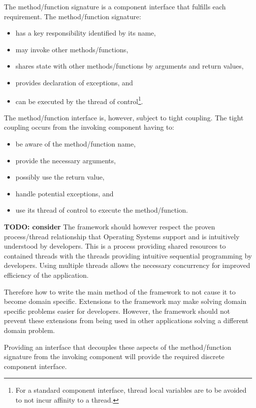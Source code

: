 \documentclass[prodmode]{style/acmlarge}
\begin{document}
The method/function signature is a component interface that fulfills each
requirement.  The method/function signature:
\begin{itemize}
  \item has a key responsibility identified by its name,
  \item may invoke other methods/functions,
  \item shares state with other methods/functions by arguments and return values,
  \item provides declaration of exceptions, and
  \item can be executed by the thread of control\footnote{For a standard component interface, thread local variables are to be avoided to not incur affinity to a thread.}.
\end{itemize}

The method/function interface is, however, subject to tight coupling.  The tight
coupling occurs from the invoking component having to:
\begin{itemize}
  \item be aware of the method/function name,
  \item provide the necessary arguments,
  \item possibly use the return value,
  \item handle potential exceptions, and
  \item use its thread of control to execute the method/function.
\end{itemize}

\textbf{TODO: consider} The framework should however respect the proven
process/thread relationship that Operating Systems support and is intuitively
understood by developers.  This is a process providing shared resources to
contained threads with the threads providing intuitive sequential programming by
developers.  Using multiple threads allows the necessary concurrency for
improved efficiency of the application.

Therefore how to write the main method of the framework to not cause it to become
domain specific.  Extensions to the framework may make solving domain specific
problems easier for developers.  However, the framework should not prevent these
extensions from being used in other applications solving a different domain
problem.

Providing an interface that decouples these aspects of the method/function
signature from the invoking component will provide the required discrete
component interface.
\end{document}
